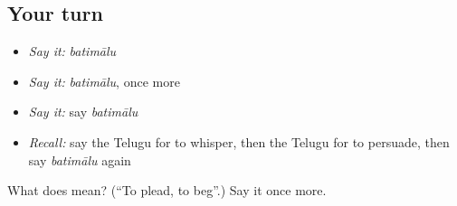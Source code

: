 \subsection*{Your turn}
\begin{itemize}
\raggedright
  \item \emph{Say it:} \emph{batimālu}
  \item \emph{Say it:} \emph{batimālu}, once more
  \item \emph{Say it:} say \emph{batimālu}
  \item \emph{Recall:} say the Telugu for to whisper, then the Telugu for to persuade, then say \emph{batimālu} again
\end{itemize}

\begin{tcolorbox}[breakable,colback=teal!4,colframe=teal!35!black,title={Before you move on}]
What does  mean? (\textquotedblleft{}To plead, to beg\textquotedblright{}.) Say it once more.
\end{tcolorbox}
